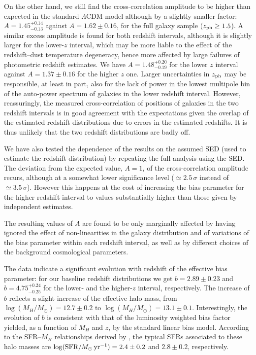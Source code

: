 On the other hand, we still find the cross-correlation amplitude to be higher than expected in the standard $\Lambda$CDM model although by a slightly smaller factor: $A=1.45^{+0.14}_{-0.13}$ against $A=1.62 \pm 0.16$, for the full galaxy sample ($z_{\rm{ph}}\ge 1.5$). A similar excess amplitude is found for both redshift intervals, although it is slightly larger for the lower-$z$ interval, which may be more liable to the effect of the redshift--dust temperature degeneracy, hence more affected by large failures of photometric redshift estimates. We have $A=1.48^{+0.20}_{-0.19}$ for the lower $z$ interval against $A=1.37 \pm 0.16$ for the higher $z$ one. Larger uncertainties in $z_{\rm{ph}}$ may be responsible, at least in part, also for the lack of power in the lowest multipole bin of the auto-power spectrum of galaxies in the lower redshift interval. However, reassuringly, the measured cross-correlation of positions of galaxies in the two redshift intervals is in good agreement with the expectations given the overlap of the estimated redshift distributions due to errors in the estimated redshifts. It is thus unlikely that the two redshift distributions are badly off.

We have also tested the dependence of the results on the assumed SED (used to estimate the redshift distribution) by repeating the full analysis using the \cite{Pearson2013} SED. The deviation from the expected value, $A=1$, of the cross-correlation amplitude recurs, although at a somewhat lower significance level ($\simeq 2.5\,\sigma$ instead of $\simeq 3.5\,\sigma$). However this happens at the cost of increasing the bias parameter for the higher redshift interval to values substantially higher than those given by independent estimates.

The resulting values of $A$ are found to be only marginally affected by having ignored the effect of non-linearities in the galaxy distribution and of variations of the bias parameter within each redshift interval, as well as by different choices of the background cosmological parameters.

The data indicate a significant evolution with redshift of the effective bias parameter: for our baseline redshift distributions we get $b = 2.89 \pm 0.23$ and $b=4.75^{+0.24}_{-0.25}$ for the lower- and the higher-$z$ interval, respectively. The increase of $b$ reflects a slight increase of the effective halo mass, from $\log (M_H/M_\odot)=12.7\pm 0.2$ to $\log (M_H/M_\odot)=13.1\pm 0.1$. Interestingly, the evolution of $b$ is consistent with that of the luminosity weighted bias factor yielded, as a function of $M_H$ and $z$, by the standard linear bias model. According to the SFR--$M_H$ relationships derived by \citet{Aversa2015}, the typical SFRs associated to these halo masses are $\log(\hbox{SFR}/M_{\odot}\,\hbox{yr}^{-1})=2.4\pm 0.2$ and $2.8\pm 0.2$, respectively.

